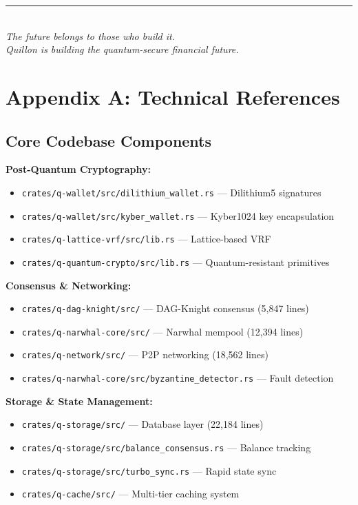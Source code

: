 \documentclass[11pt,a4paper]{scrartcl}
\begin{document}
\begin{center}
\rule{0.5\textwidth}{0.4pt}\\[1em]
\textit{The future belongs to those who build it.}\\
\textit{Quillon is building the quantum-secure financial future.}
\end{center}

\newpage

\section*{Appendix A: Technical References}

\subsection*{Core Codebase Components}

\textbf{Post-Quantum Cryptography:}
\begin{itemize}
\item \texttt{crates/q-wallet/src/dilithium\_wallet.rs} — Dilithium5 signatures
\item \texttt{crates/q-wallet/src/kyber\_wallet.rs} — Kyber1024 key encapsulation
\item \texttt{crates/q-lattice-vrf/src/lib.rs} — Lattice-based VRF
\item \texttt{crates/q-quantum-crypto/src/lib.rs} — Quantum-resistant primitives
\end{itemize}

\textbf{Consensus \& Networking:}
\begin{itemize}
\item \texttt{crates/q-dag-knight/src/} — DAG-Knight consensus (5,847 lines)
\item \texttt{crates/q-narwhal-core/src/} — Narwhal mempool (12,394 lines)
\item \texttt{crates/q-network/src/} — P2P networking (18,562 lines)
\item \texttt{crates/q-narwhal-core/src/byzantine\_detector.rs} — Fault detection
\end{itemize}

\textbf{Storage \& State Management:}
\begin{itemize}
\item \texttt{crates/q-storage/src/} — Database layer (22,184 lines)
\item \texttt{crates/q-storage/src/balance\_consensus.rs} — Balance tracking
\item \texttt{crates/q-storage/src/turbo\_sync.rs} — Rapid state sync
\item \texttt{crates/q-cache/src/} — Multi-tier caching system
\end{itemize}
\end{document}
